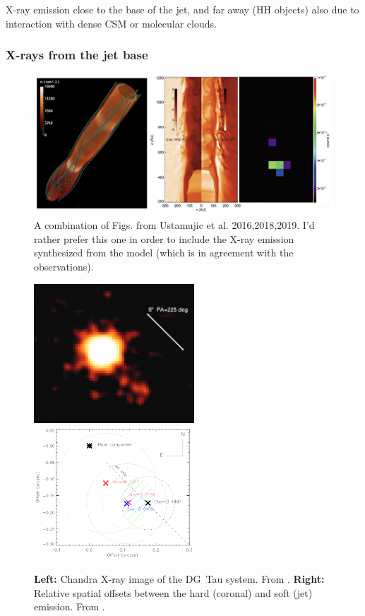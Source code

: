 X-ray emission close to the base of the jet, and far away (HH objects) also due to interaction with dense CSM or molecular clouds.
 

 
\subsubsection{X-rays from the jet base}



 
\begin{figure}
    \centering
    \includegraphics[width=12cm]{figs/ustamujic.png}
    \caption{A combination of Figs. from Ustamujic et al. 2016,2018,2019. I'd rather prefer this one in order to include the X-ray emission synthesized from the model (which is in agreement with the observations).}
    \label{fig:ustamujic}
\end{figure}



\begin{figure}[t]

\includegraphics[width=6cm]{figs/dg_tau_X}
\includegraphics[width=6cm]{figs/dg_tau_offsets}

\caption{{\bf Left: } Chandra X-ray image of the DG~Tau system. From \citet{2011ASPC..448..617G}.
         {\bf Right: } Relative spatial offsets between the hard (coronal) and soft (jet) emission. From \citet{Schneider_2008}. \label{fig:dg_tau_X}}
\end{figure}


